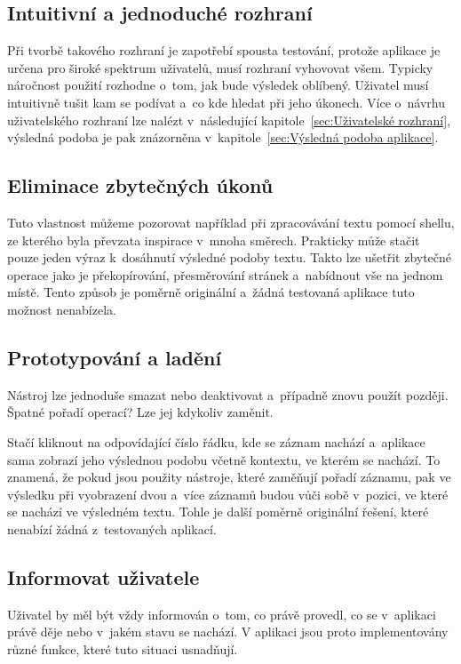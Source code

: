 \subsection*{Intuitivní a jednoduché rozhraní}
Při tvorbě takového rozhraní je zapotřebí spousta testování, protože aplikace je určena pro široké spektrum uživatelů, musí rozhraní vyhovovat všem. Typicky náročnost použití rozhodne o~tom, jak bude výsledek oblíbený. Uživatel musí intuitivně tušit kam se podívat a~co kde hledat při jeho úkonech. Více o~návrhu uživatelského rozhraní lze nalézt v~následující kapitole~\ref{sec:Uživatelské rozhraní}, výsledná podoba je pak znázorněna v~kapitole~\ref{sec:Výsledná podoba aplikace}.

\subsection*{Eliminace zbytečných úkonů}
Tuto vlastnost můžeme pozorovat například při zpracovávání textu pomocí shellu, ze kterého byla převzata inspirace v~mnoha směrech. Prakticky může stačit pouze jeden výraz k~dosáhnutí výsledné podoby textu. Takto lze ušetřit zbytečné operace jako je překopírování, přesměrování stránek a~nabídnout vše na jednom místě. Tento způsob je poměrně originální a~žádná testovaná aplikace tuto možnost nenabízela.

\subsection*{Prototypování a ladění}
 Nástroj lze jednoduše smazat nebo deaktivovat a~případně znovu použít později. Špatné pořadí operací? Lze jej kdykoliv zaměnit. 

 Stačí kliknout na odpovídající číslo řádku, kde se záznam nachází a~aplikace sama zobrazí jeho výslednou podobu včetně kontextu, ve kterém se nachází. To znamená, že pokud jsou použity nástroje, které zaměňují pořadí záznamu, pak ve výsledku při vyobrazení dvou a~více záznamů budou vůči sobě v~pozici, ve které se nachází ve výsledném textu. Tohle je další poměrně originální řešení, které nenabízí žádná z~testovaných aplikací.

\subsection*{Informovat uživatele}
\label{sec:Informovat uživatele}
Uživatel by měl být vždy informován o~tom, co právě provedl, co se v~aplikaci právě děje nebo v~jakém stavu se nachází. V aplikaci jsou proto implementovány různé funkce, které tuto situaci usnadňují.

